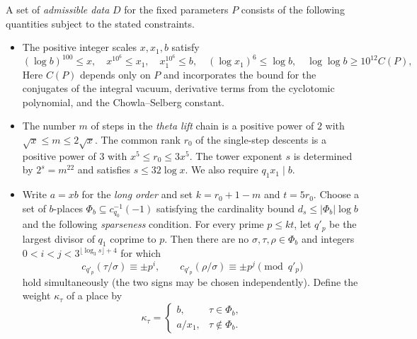 \begin{definition}
\label{def:admissible-data}
\emitthmsource
A set of \emph{admissible data} $D$ for the fixed parameters $P$ consists of the following quantities subject to the stated constraints.
\begin{itemize}
\item The positive integer scales $x,x_1,b$ satisfy
\begin{equation}
 (\log b)^{100}\le x,\quad x^{10^6}\le x_1,\quad x_1^{10^6}\le b,\quad
 (\log x_1)^6\le\log b,\quad \log\log b\ge 10^{12}C(P),
\label{eq:admissible-scales}
\end{equation}
Here $C(P)$ depends only on $P$ and incorporates the bound for the conjugates of the integral vacuum, derivative terms from the cyclotomic polynomial, and the Chowla--Selberg constant.
\item The number $m$ of steps in the \emph{theta lift} chain is a positive power of $2$ with $\sqrt x\le m\le2\sqrt x$. The common rank $r_0$ of the single-step descents is a positive power of $3$ with $x^5\le r_0\le3x^5$. The tower exponent $s$ is determined by $2^s=m^{22}$ and satisfies $s\le32\log x$. We also require $q_1x_1\mid b$.
\item Write $a=xb$ for the \emph{long order} and set $k=r_0+1-m$ and $t=5r_0$. Choose a set of $b$-places $\Phi_b\subseteq c_{q_0}^{-1}(-1)$ satisfying the cardinality bound $d_s\le|\Phi_b|\log b$ and the following \emph{sparseness} condition. For every prime $p\le kt$, let $q'_p$ be the largest divisor of $q_1$ coprime to $p$. Then there are no $\sigma,\tau,\rho\in\Phi_b$ and integers $0<i<j<3^{\lfloor\log_3s\rfloor+4}$ for which
\[
 c_{q'_p}(\tau/\sigma)\equiv\pm p^i,\qquad
 c_{q'_p}(\rho/\sigma)\equiv\pm p^j\pmod{q'_p}
\]
hold simultaneously (the two signs may be chosen independently). Define the weight $\kappa_\tau$ of a place by
\begin{equation}
 \kappa_\tau=
 \begin{cases}
 b, &\tau\in\Phi_b,\\
 a/x_1,&\tau\notin\Phi_b.
 \end{cases}

\end{equation}
\end{itemize}
\end{definition}

